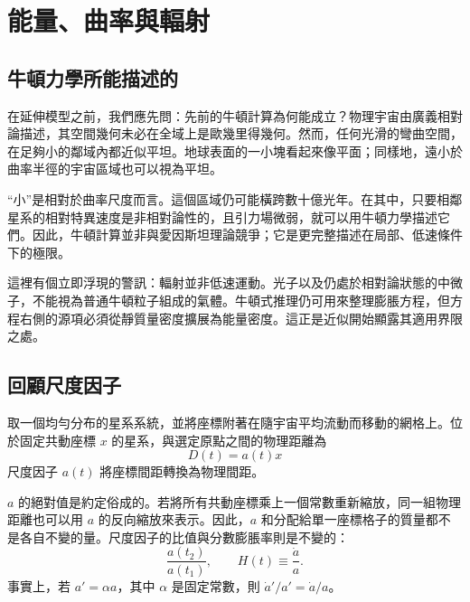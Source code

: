 \chapter{能量、曲率與輻射}


\section{牛頓力學所能描述的}

在延伸模型之前，我們應先問：先前的牛頓計算為何能成立？物理宇宙由廣義相對論描述，其空間幾何未必在全域上是歐幾里得幾何。然而，任何光滑的彎曲空間，在足夠小的鄰域內都近似平坦。地球表面的一小塊看起來像平面；同樣地，遠小於曲率半徑的宇宙區域也可以視為平坦。

``小''是相對於曲率尺度而言。這個區域仍可能橫跨數十億光年。在其中，只要相鄰星系的相對特異速度是非相對論性的，且引力場微弱，就可以用牛頓力學描述它們。因此，牛頓計算並非與愛因斯坦理論競爭；它是更完整描述在局部、低速條件下的極限。

這裡有個立即浮現的警訊：輻射並非低速運動。光子以及仍處於相對論狀態的中微子，不能視為普通牛頓粒子組成的氣體。牛頓式推理仍可用來整理膨脹方程，但方程右側的源項必須從靜質量密度擴展為能量密度。這正是近似開始顯露其適用界限之處。

\section{回顧尺度因子}

取一個均勻分布的星系系統，並將座標附著在隨宇宙平均流動而移動的網格上。位於固定共動座標 \(x\) 的星系，與選定原點之間的物理距離為
\begin{equation}
D(t)=a(t)x
\label{eq:c02-distance}
\end{equation}
尺度因子 \(a(t)\) 將座標間距轉換為物理間距。

\(a\) 的絕對值是約定俗成的。若將所有共動座標乘上一個常數重新縮放，同一組物理距離也可以用 \(a\) 的反向縮放來表示。因此，\(a\) 和分配給單一座標格子的質量都不是各自不變的量。尺度因子的比值與分數膨脹率則是不變的：
\begin{equation}
\frac{a(t_2)}{a(t_1)},
\qquad
H(t)\equiv\frac{\dot a}{a}.
\label{eq:c02-hubble}
\end{equation}
事實上，若 \(a'=\alpha a\)，其中 \(\alpha\) 是固定常數，則 \(\dot a'/a'=\dot a/a\)。

